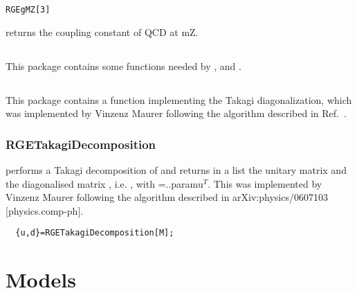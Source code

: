 \documentclass[10pt,a4paper,twoside]{scrartcl}
\begin{document}
\begin{verbatim}
RGEgMZ[3]
\end{verbatim}
returns the coupling constant of QCD at mZ.





\subsection[\package{RGEUtilities}]{}
This package contains some functions needed by ,
and .




\subsection[\package{RGETakagi}]{}
This package contains a function implementing the Takagi diagonalization, which was implemented by Vinzenz Maurer following the algorithm described in Ref.~\cite{Hahn:2006xx}.


\subsubsection{RGETakagiDecomposition}

 performs a Takagi decomposition of  and returns in a list the unitary matrix  and the diagonalised matrix , i.e. {,} with =..param{u}$^T$. This was implemented by Vinzenz Maurer following the algorithm described in arXiv:physics/0607103 [physics.comp-ph].

\begin{verbatim}
  {u,d}=RGETakagiDecomposition[M];
\end{verbatim}





\section{Models\label{sec:Models}}

\end{document}
